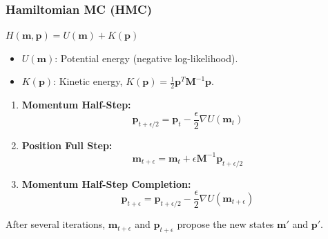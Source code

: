 \documentclass[aspectratio=169]{beamer}
\begin{document}
\begin{frame}
\frametitle{\textbf{Hamiltomian MC (HMC)}}



$H(\mathbf{m}, \mathbf{p}) = U(\mathbf{m}) + K(\mathbf{p})$

\begin{itemize}
    \item \( U(\mathbf{m}) \): Potential energy (negative log-likelihood).
    \item \( K(\mathbf{p}) \): Kinetic energy, \( K(\mathbf{p}) = \frac{1}{2} \mathbf{p}^T \mathbf{M}^{-1} \mathbf{p} \).
\end{itemize}

\begin{enumerate}
    \item [-] \textbf{Momentum Half-Step:}
    \[
    \mathbf{p}_{t + \epsilon/2} = \mathbf{p}_t - \frac{\epsilon}{2} \nabla U(\mathbf{m}_t)
    \]
    \item [-] \textbf{Position Full Step:}
    \[
    \mathbf{m}_{t + \epsilon} = \mathbf{m}_t + \epsilon \mathbf{M}^{-1} \mathbf{p}_{t + \epsilon/2}
    \]
    \item [-] \textbf{Momentum Half-Step Completion:}
    \[
    \mathbf{p}_{t + \epsilon} = \mathbf{p}_{t + \epsilon/2} - \frac{\epsilon}{2} \nabla U(\mathbf{m}_{t + \epsilon})
    \]
\end{enumerate}
After several iterations, \( \mathbf{m}_{t + \epsilon} \) and \( \mathbf{p}_{t + \epsilon} \) propose the new states \( \mathbf{m}' \) and \( \mathbf{p}' \).

\end{frame}
\end{document}

